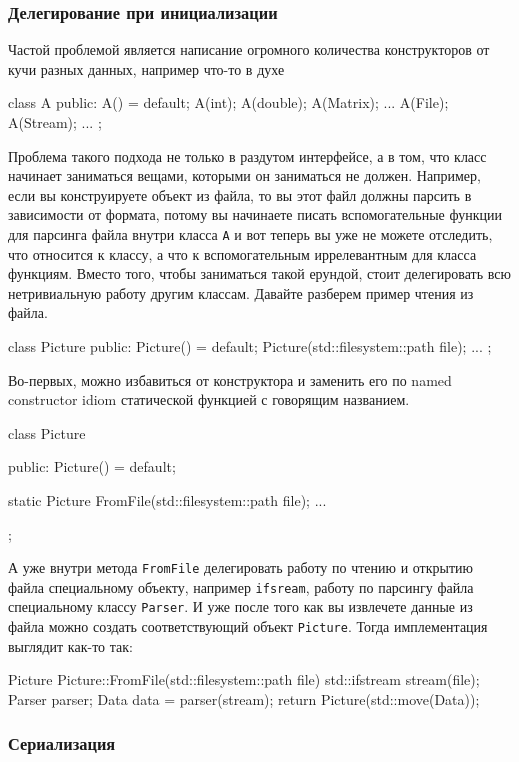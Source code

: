 \subsubsection{Делегирование при инициализации}

Частой проблемой является написание огромного количества конструкторов от кучи разных данных, например что-то в духе
\begin{cppcode}
class A {
public:
  A() = default;
  A(int);
  A(double);
  A(Matrix);
  ...
  A(File);
  A(Stream);
  ...
};
\end{cppcode}
Проблема такого подхода не только в раздутом интерфейсе, а в том, что класс начинает заниматься вещами, которыми он заниматься не должен.
Например, если вы конструируете объект из файла, то вы этот файл должны парсить в зависимости от формата, потому вы начинаете писать вспомогательные функции для парсинга файла внутри класса \verb"A" и вот теперь вы уже не можете отследить, что относится к классу, а что к вспомогательным иррелевантным для класса функциям.
Вместо того, чтобы заниматься такой ерундой, стоит делегировать всю нетривиальную работу другим классам.
Давайте разберем пример чтения из файла.
\begin{cppcode}
class Picture {
public:
  Picture() = default;
  Picture(std::filesystem::path file);
  ...
};
\end{cppcode}
Во-первых, можно избавиться от конструктора и заменить его по named constructor idiom статической функцией с говорящим названием.
\begin{cppcode}
class Picture {
public:
  Picture() = default;
  
  static Picture FromFile(std::filesystem::path file);
  ...
};
\end{cppcode}
А уже внутри метода \verb"FromFile" делегировать работу по чтению и открытию файла специальному объекту, например \verb"ifsream", работу по парсингу файла специальному классу \verb"Parser".
И уже после того как вы извлечете данные из файла можно создать соответствующий объект \verb"Picture".
Тогда имплементация выглядит как-то так:
\begin{cppcode}
Picture Picture::FromFile(std::filesystem::path file) {
  std::ifstream stream(file);
  Parser parser;
  Data data = parser(stream);
  return Picture(std::move(Data));
}
\end{cppcode}

\subsubsection{Сериализация}

